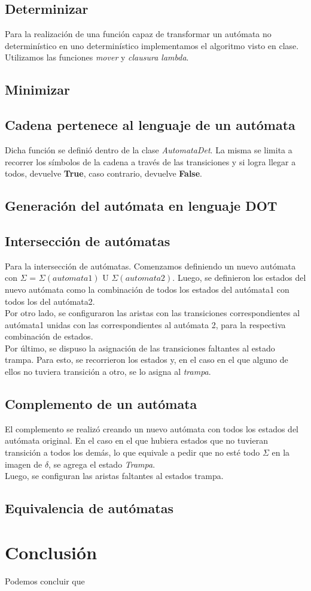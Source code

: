 \documentclass[a4paper, 10pt, twoside]{article}
\begin{document}
\subsection{Determinizar}
Para la realización de una función capaz de transformar un autómata no determinístico en uno determinístico implementamos el algoritmo visto en clase. Utilizamos las funciones \textit{mover} y \textit{clausura lambda}.

\subsection{Minimizar}

\subsection{Cadena pertenece al lenguaje de un autómata}
Dicha función se definió dentro de la clase \textit{AutomataDet}. La misma se limita a recorrer los símbolos de la cadena a través de las transiciones y si logra llegar a todos, devuelve \textbf{True}, caso contrario, devuelve \textbf{False}.

\subsection{Generación del autómata en lenguaje DOT}

\subsection{Intersección de autómatas}
Para la intersección de autómatas. Comenzamos definiendo un nuevo autómata con $\Sigma$ = $\Sigma (automata1)$ U $\Sigma (automata2)$. Luego, se definieron los estados del nuevo autómata como la combinación de todos los estados del autómata1 con todos los del autómata2.\\
Por otro lado, se configuraron las aristas con las transiciones correspondientes al autómata1 unidas con las correspondientes al autómata 2, para la respectiva combinación de estados.\\
Por último, se dispuso la asignación de las transiciones faltantes al estado trampa. Para esto, se recorrieron los estados y, en el caso en el que alguno de ellos no tuviera transición a otro, se lo asigna al \textit{trampa}.

\subsection{Complemento de un autómata}
El complemento se realizó creando un nuevo autómata con todos los estados del autómata original. En el caso en el que hubiera estados que no tuvieran transición a todos los demás, lo que equivale a pedir que no esté todo $\Sigma$ en la imagen de $\delta$, se agrega el estado \textit{Trampa}.\\
Luego, se configuran las aristas faltantes al estados trampa.

\subsection{Equivalencia de autómatas}

\newpage
\section{Conclusión}
Podemos concluir que
\end{document}
